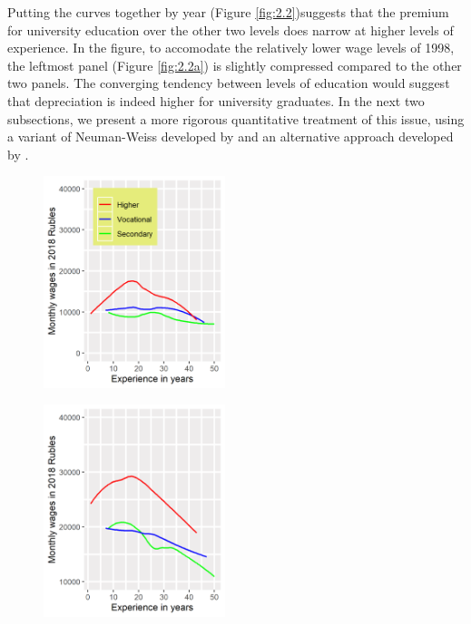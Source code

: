 \documentclass[12pt,a4paper]{article}
\numberwithin{equation}{section}
\begin{document}
Putting the curves together by year (Figure \ref{fig:2.2})suggests that the premium for university education over the other two levels does narrow at higher levels of experience. In the figure, to accomodate the relatively lower wage levels of 1998, the leftmost panel (Figure \ref{fig:2.2a}) is slightly compressed compared to the other two panels. The  converging tendency between levels of education would suggest that depreciation is indeed higher for university graduates. In the next two subsections, we present a more rigorous quantitative treatment of this issue, using a variant of Neuman-Weiss developed by \citet{murillo_172._2006} and an alternative approach developed by \citet{arrazola_132b._2005}.

	
	\begin{figure}[H]
		\begin{minipage}[b]{.3\linewidth}
			\centering
			\hspace*{-0.7in}
			\includegraphics[width=150pt]{dp01_98.png}
			\label{fig:2.2a}
		\end{minipage}
		\hfill
		\begin{minipage}[b]{.3\linewidth}
			\centering
			\hspace*{-0.7in}
			\includegraphics[width=150pt]{dp01_06.png}
			\label{fig:2.2b}
		\end{minipage}

\end{figure}
\end{document}
